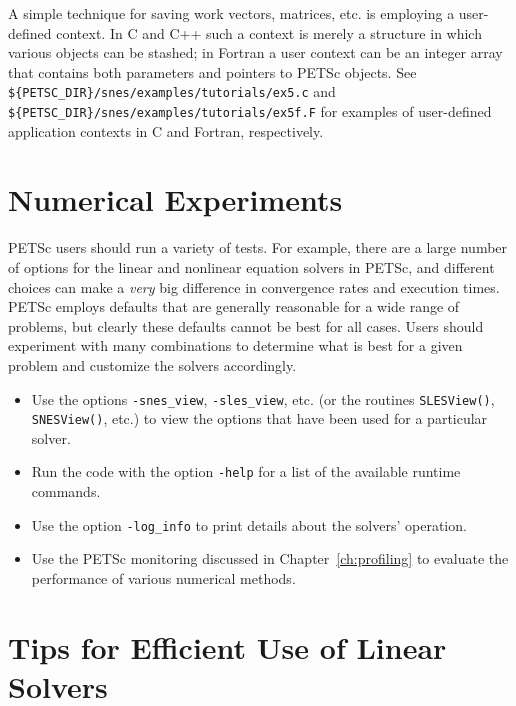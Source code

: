 {A simple technique for saving work vectors, matrices, etc. is employing
a user-defined context.  In C and C++ such a context is merely a
structure in which various objects can be stashed; in Fortran a user
context can be an integer array that contains both parameters and pointers
to PETSc objects. See {\tt \$\{PETSC\_DIR\}/snes/examples/tutorials/ex5.c} and 
{\tt \$\{PETSC\_DIR\}/snes/examples/tutorials/ex5f.F} for examples of user-defined application
contexts in C and Fortran, respectively.

\section{Numerical Experiments}

PETSc users should run a variety of tests.  For example, there are a large number of options 
for the linear and nonlinear equation solvers in PETSc, and different 
choices can make a {\em very} big difference in convergence rates and execution 
times.  PETSc employs defaults that are generally reasonable for a wide
range of problems, but clearly these defaults cannot be best for all
cases.  Users should experiment with many combinations to determine 
what is best for a given problem and customize the solvers accordingly.
\begin{itemize}
\item Use the options {\tt -snes\_view}, {\tt -sles\_view}, etc. (or the routines 
     {\tt SLESView()}, {\tt SNESView()}, etc.) to view the options that have been
     used for a particular solver.
\item Run the code with the option {\tt -help} for a list of the available 
     runtime commands.
\item Use the option {\tt -log\_info} to print details about the solvers' operation.
\item Use the PETSc monitoring discussed in Chapter~\ref{ch:profiling}
     to evaluate the performance of various numerical methods.
\end{itemize}

\section{Tips for Efficient Use of Linear Solvers}
\label{sec:slestips}

}
